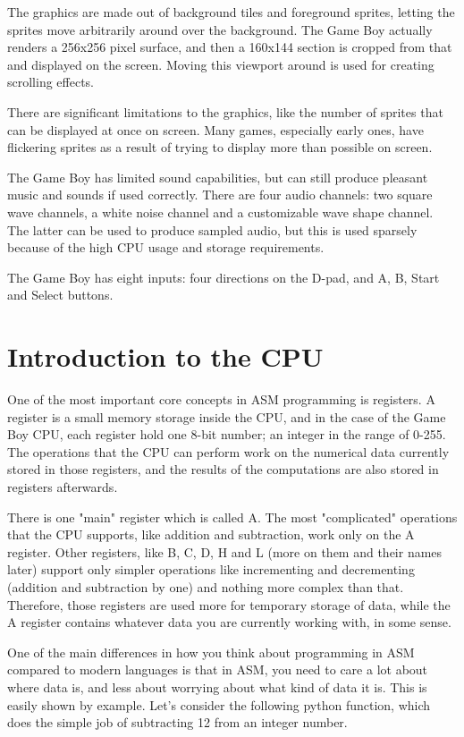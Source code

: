 \documentclass[11pt]{book}
\begin{document}
The graphics are made out of background tiles and foreground sprites, letting the sprites move arbitrarily around over the background. The Game Boy actually renders a 256x256 pixel surface, and then a 160x144 section is cropped from that and displayed on the screen. Moving this viewport around is used for creating scrolling effects.

There are significant limitations to the graphics, like the number of sprites that can be displayed at once on screen. Many games, especially early ones, have flickering sprites as a result of trying to display more than possible on screen. 

The Game Boy has limited sound capabilities, but can still produce pleasant music and sounds if used correctly. There are four audio channels: two square wave channels, a white noise channel and a customizable wave shape channel. The latter can be used to produce sampled audio, but this is used sparsely because of the high CPU usage and storage requirements. 

The Game Boy has eight inputs: four directions on the D-pad, and A, B, Start and Select buttons. 


\section{Introduction to the CPU}
\label{cpu}
One of the most important core concepts in ASM programming is registers. A register is a small memory storage inside the CPU, and in the case of the Game Boy CPU, each register hold one 8-bit number; an integer in the range of 0-255. The operations that the CPU can perform work on the numerical data currently stored in those registers, and the results of the computations are also stored in registers afterwards. 

There is one "main" register which is called A. The most "complicated" operations that the CPU supports, like addition and subtraction, work only on the A register. Other registers, like B, C, D, H and L (more on them and their names later) support only simpler operations like incrementing and decrementing (addition and subtraction by one) and nothing more complex than that. Therefore, those registers are used more for temporary storage of data, while the A register contains whatever data you are currently working with, in some sense.

One of the main differences in how you think about programming in ASM compared to modern languages is that in ASM, you need to care a lot about where data is, and less about worrying about what kind of data it is. This is easily shown by example. Let's consider the following python function, which does the simple job of subtracting 12 from an integer number.
\end{document}
